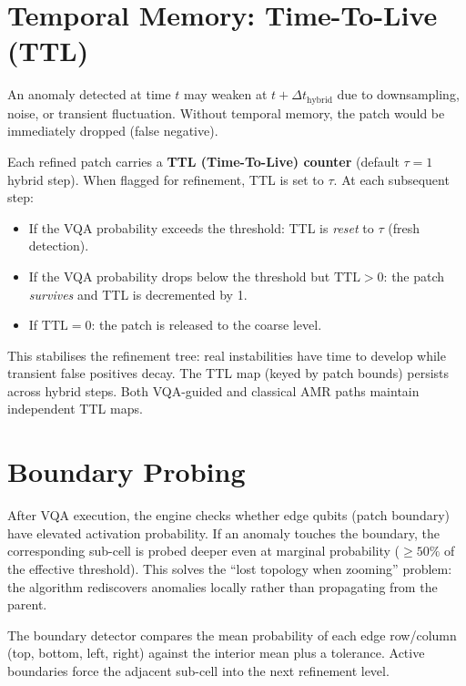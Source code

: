 \documentclass[12pt, a4paper, oneside]{report}
\begin{document}
\section{Temporal Memory: Time-To-Live (TTL)}

An anomaly detected at time $t$ may weaken at $t + \Delta t_{\text{hybrid}}$ due to downsampling, noise, or transient fluctuation. Without temporal memory, the patch would be immediately dropped (false negative).

Each refined patch carries a \textbf{TTL (Time-To-Live) counter} (default $\tau = 1$ hybrid step). When flagged for refinement, TTL is set to $\tau$. At each subsequent step:
\begin{itemize}
    \item If the VQA probability exceeds the threshold: TTL is \textit{reset} to $\tau$ (fresh detection).
    \item If the VQA probability drops below the threshold but $\text{TTL} > 0$: the patch \textit{survives} and TTL is decremented by 1.
    \item If $\text{TTL} = 0$: the patch is released to the coarse level.
\end{itemize}
This stabilises the refinement tree: real instabilities have time to develop while transient false positives decay. The TTL map (keyed by patch bounds) persists across hybrid steps. Both VQA-guided and classical AMR paths maintain independent TTL maps.

\section{Boundary Probing}

After VQA execution, the engine checks whether edge qubits (patch boundary) have elevated activation probability. If an anomaly touches the boundary, the corresponding sub-cell is probed deeper even at marginal probability ($\geq 50\%$ of the effective threshold). This solves the ``lost topology when zooming'' problem: the algorithm rediscovers anomalies locally rather than propagating from the parent.

The boundary detector compares the mean probability of each edge row/column (top, bottom, left, right) against the interior mean plus a tolerance. Active boundaries force the adjacent sub-cell into the next refinement level.
\end{document}
